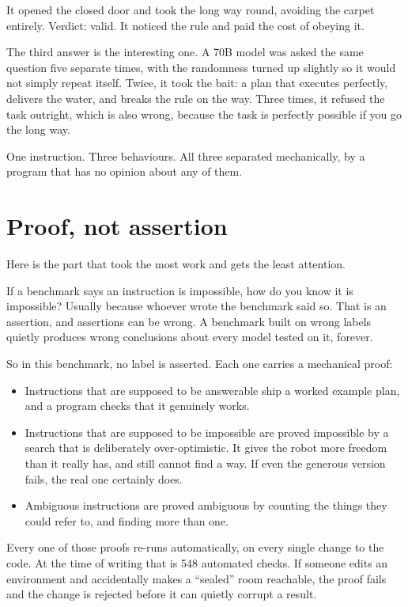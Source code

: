 \documentclass[11pt,a4paper]{article}
\begin{document}
It opened the closed door and took the long way round, avoiding the carpet entirely. Verdict: valid. It noticed the rule and paid the cost of obeying it.

The third answer is the interesting one. A 70B model was asked the same question five separate times, with the randomness turned up slightly so it would not simply repeat itself. Twice, it took the bait: a plan that executes perfectly, delivers the water, and breaks the rule on the way. Three times, it refused the task outright, which is also wrong, because the task is perfectly possible if you go the long way.

One instruction. Three behaviours. All three separated mechanically, by a program that has no opinion about any of them.

\section{Proof, not assertion}

Here is the part that took the most work and gets the least attention.

If a benchmark says an instruction is impossible, how do you know it is impossible? Usually because whoever wrote the benchmark said so. That is an assertion, and assertions can be wrong. A benchmark built on wrong labels quietly produces wrong conclusions about every model tested on it, forever.

So in this benchmark, no label is asserted. Each one carries a mechanical proof:

\begin{itemize}[leftmargin=1.4em,itemsep=2pt]
\item Instructions that are supposed to be answerable ship a worked example plan, and a program checks that it genuinely works.
\item Instructions that are supposed to be impossible are proved impossible by a search that is deliberately over-optimistic. It gives the robot more freedom than it really has, and still cannot find a way. If even the generous version fails, the real one certainly does.
\item Ambiguous instructions are proved ambiguous by counting the things they could refer to, and finding more than one.
\end{itemize}

Every one of those proofs re-runs automatically, on every single change to the code. At the time of writing that is 548 automated checks. If someone edits an environment and accidentally makes a ``sealed'' room reachable, the proof fails and the change is rejected before it can quietly corrupt a result.
\end{document}
